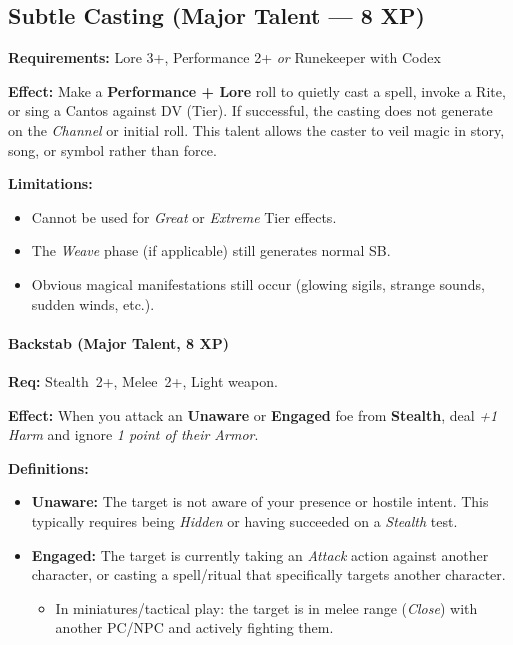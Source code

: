 \subsection*{Subtle Casting (Major Talent --- 8 XP)}

\textbf{Requirements:} Lore 3+, Performance 2+ \emph{or} Runekeeper with Codex

\textbf{Effect:} Make a \textbf{Performance + Lore} roll to quietly cast a spell, invoke a Rite, or sing a Cantos against DV (Tier). 
If successful, the casting does not generate  on the \emph{Channel} or initial roll. 
This talent allows the caster to veil magic in story, song, or symbol rather than force.

\textbf{Limitations:}
\begin{itemize}
  \item Cannot be used for \emph{Great} or \emph{Extreme} Tier effects.
  \item The \emph{Weave} phase (if applicable) still generates normal SB.
  \item Obvious magical manifestations still occur (glowing sigils, strange sounds, sudden winds, etc.).
\end{itemize}

\paragraph{Backstab (Major Talent, 8 XP)} 
\textbf{Req:} Stealth~2+, Melee~2+, Light weapon.  

\textbf{Effect:} When you attack an \textbf{Unaware} or \textbf{Engaged} foe from \textbf{Stealth}, deal \emph{+1 Harm} and ignore \emph{1 point of their Armor}.  

\textbf{Definitions:}  
\begin{itemize}
  \item \textbf{Unaware:} The target is not aware of your presence or hostile intent. This typically requires being \emph{Hidden} or having succeeded on a \emph{Stealth} test.  
  \item \textbf{Engaged:} The target is currently taking an \emph{Attack} action against another character, or casting a spell/ritual that specifically targets another character.  
  \begin{itemize}
    \item In miniatures/tactical play: the target is in melee range (\emph{Close}) with another PC/NPC and actively fighting them.  
  \end{itemize}
\end{itemize}

